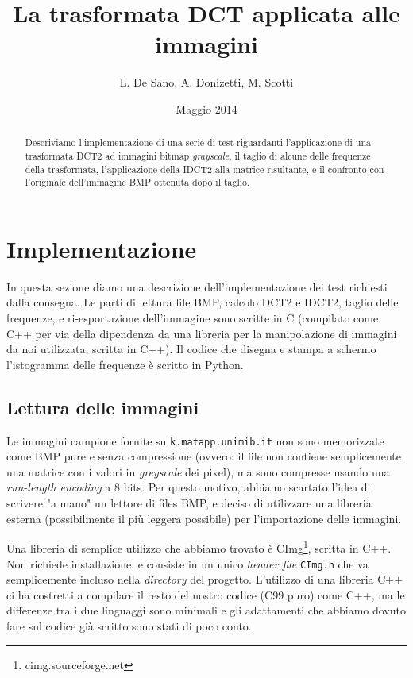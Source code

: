 \documentclass[11pt,a4paper]{scrartcl}
\author{L. De Sano, A. Donizetti, M. Scotti}
\title{La trasformata DCT applicata alle immagini}
\date{Maggio 2014}
\begin{document}
\maketitle
\begin{abstract}
Descriviamo l'implementazione di una serie di test riguardanti l'applicazione di una trasformata DCT2 ad immagini bitmap \textit{grayscale}, il taglio di alcune delle frequenze della trasformata, l'applicazione della IDCT2 alla matrice risultante, e il confronto con l'originale dell'immagine BMP ottenuta dopo il taglio.
\end{abstract}

\section*{Implementazione}

In questa sezione diamo una descrizione dell'implementazione dei test richiesti dalla consegna. Le parti di lettura file BMP, calcolo DCT2 e IDCT2, taglio delle frequenze, e ri-esportazione dell'immagine sono scritte in C (compilato come C++ per via della dipendenza da una libreria per la manipolazione di immagini da noi utilizzata, scritta in C++). Il codice che disegna e stampa a schermo l'istogramma delle frequenze è scritto in Python.

\subsection*{Lettura delle immagini}

Le immagini campione fornite su \texttt{k.matapp.unimib.it} non sono memorizzate come BMP pure e senza compressione (ovvero: il file non contiene semplicemente una matrice con i valori in \emph{greyscale} dei pixel), ma sono compresse usando una \emph{run-length encoding} a 8 bits. Per questo motivo, abbiamo scartato l'idea di scrivere "a mano" un lettore di files BMP, e deciso di utilizzare una libreria esterna (possibilmente il più leggera possibile) per l'importazione delle immagini.

Una libreria di semplice utilizzo che abbiamo trovato è CImg\footnote{cimg.sourceforge.net}, scritta in C++. Non richiede installazione, e consiste in un unico \emph{header file} \texttt{CImg.h} che va semplicemente incluso nella \emph{directory} del progetto. L'utilizzo di una libreria C++ ci ha costretti a compilare il resto del nostro codice (C99 puro) come C++, ma le differenze tra i due linguaggi sono minimali e gli adattamenti che abbiamo dovuto fare sul codice già scritto sono stati di poco conto.
\end{document}
